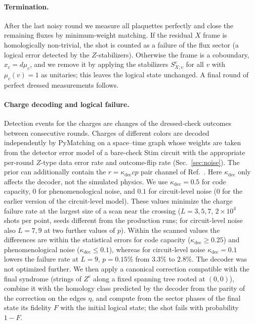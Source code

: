\documentclass[a4paper]{article}
\begin{document}
\paragraph{Termination.}
After the last noisy round we measure all plaquettes perfectly and close the remaining fluxes by minimum-weight matching. If the residual $X$ frame is homologically non-trivial, the shot is counted as a failure of the flux sector (a logical error detected by the $Z$-stabilizers). Otherwise the frame is a coboundary, $x_c=d\mu_c$, and we remove it by applying the stabilizers $S^c_{X;v}$ for all $v$ with $\mu_c(v)=1$ as unitaries; this leaves the logical state unchanged. A final round of perfect dressed measurements follows.

\paragraph{Charge decoding and logical failure.}
Detection events for the charges are changes of the dressed-check outcomes between consecutive rounds. Charges of different colors are decoded independently by PyMatching on a space--time graph whose weights are taken from the detector error model of a bare-check Stim circuit with the appropriate per-round $Z$-type data error rate and outcome-flip rate (Sec.~\ref{sec:noise}). The prior can additionally contain the $r=\kappa_{\mathrm{dec}}cp$ pair channel of Ref.~\cite{haga2026aqis}. Here $\kappa_{\mathrm{dec}}$ only affects the decoder, not the simulated physics. We use $\kappa_{\mathrm{dec}}=0.5$ for code capacity, $0$ for phenomenological noise, and $0.1$ for circuit-level noise ($0$ for the earlier version of the circuit-level model). These values minimize the charge failure rate at the largest size of a scan near the crossing ($L=3,5,7$, $2\times10^4$ shots per point, seeds different from the production runs; for circuit-level noise also $L=7,9$ at two further values of $p$). Within the scanned values the differences are within the statistical errors for code capacity ($\kappa_{\mathrm{dec}}\ge0.25$) and phenomenological noise ($\kappa_{\mathrm{dec}}\le0.1$), whereas for circuit-level noise $\kappa_{\mathrm{dec}}=0.1$ lowers the failure rate at $L=9$, $p=0.15\%$ from $3.3\%$ to $2.8\%$. The decoder was not optimized further. We then apply a canonical correction compatible with the final syndrome (strings of $Z^c$ along a fixed spanning tree rooted at $(0,0)$), combine it with the homology class predicted by the decoder from the parity of the correction on the edges $\eta$, and compute from the sector phases of the final state its fidelity $F$ with the initial logical state; the shot fails with probability $1-F$.
\end{document}
